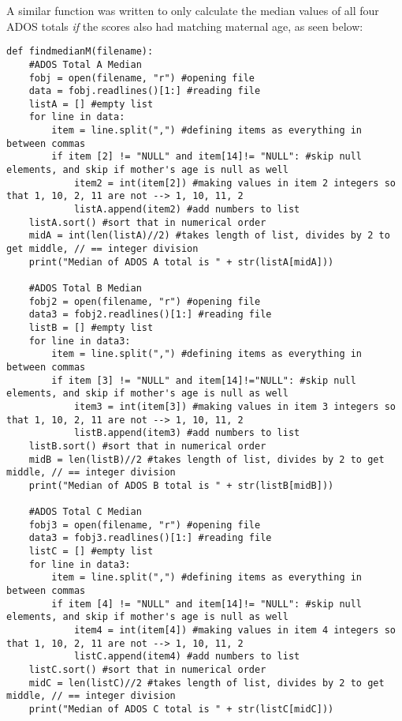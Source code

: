 \documentclass{article}
\begin{document}
A similar function was written to only calculate the median values of all four ADOS totals \textit{if} the scores also had matching maternal age, as seen below: 
\begin{verbatim}
def findmedianM(filename):
    #ADOS Total A Median
    fobj = open(filename, "r") #opening file
    data = fobj.readlines()[1:] #reading file
    listA = [] #empty list
    for line in data:
        item = line.split(",") #defining items as everything in between commas
        if item [2] != "NULL" and item[14]!= "NULL": #skip null elements, and skip if mother's age is null as well
            item2 = int(item[2]) #making values in item 2 integers so that 1, 10, 2, 11 are not --> 1, 10, 11, 2
            listA.append(item2) #add numbers to list
    listA.sort() #sort that in numerical order
    midA = int(len(listA)//2) #takes length of list, divides by 2 to get middle, // == integer division
    print("Median of ADOS A total is " + str(listA[midA]))
  
    #ADOS Total B Median
    fobj2 = open(filename, "r") #opening file
    data3 = fobj2.readlines()[1:] #reading file
    listB = [] #empty list
    for line in data3:
        item = line.split(",") #defining items as everything in between commas
        if item [3] != "NULL" and item[14]!="NULL": #skip null elements, and skip if mother's age is null as well
            item3 = int(item[3]) #making values in item 3 integers so that 1, 10, 2, 11 are not --> 1, 10, 11, 2
            listB.append(item3) #add numbers to list
    listB.sort() #sort that in numerical order
    midB = len(listB)//2 #takes length of list, divides by 2 to get middle, // == integer division
    print("Median of ADOS B total is " + str(listB[midB]))
    
    #ADOS Total C Median
    fobj3 = open(filename, "r") #opening file
    data3 = fobj3.readlines()[1:] #reading file
    listC = [] #empty list
    for line in data3:
        item = line.split(",") #defining items as everything in between commas
        if item [4] != "NULL" and item[14]!= "NULL": #skip null elements, and skip if mother's age is null as well
            item4 = int(item[4]) #making values in item 4 integers so that 1, 10, 2, 11 are not --> 1, 10, 11, 2
            listC.append(item4) #add numbers to list
    listC.sort() #sort that in numerical order
    midC = len(listC)//2 #takes length of list, divides by 2 to get middle, // == integer division
    print("Median of ADOS C total is " + str(listC[midC]))
    

\end{verbatim}
\end{document}
